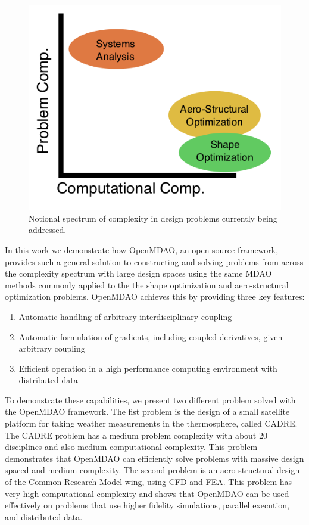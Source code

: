 \documentclass[]{aiaa-tc} %
\begin{document}
    \begin{figure}[!hbt]\begin{center}
      \includegraphics[width=.5\textwidth]{images/complexity_cartoon}
      \caption{ Notional spectrum of complexity in design problems currently being addressed. \label{fig:complexity_cartoon}}
    \end{center}\end{figure}

    In this work we demonstrate how OpenMDAO, an open-source framework, provides such a general
    solution to constructing and solving problems from across the complexity spectrum with large design spaces 
    using the same MDAO methods commonly applied to the the shape optimization and aero-structural optimization
    problems. OpenMDAO achieves this by providing three key features:

    \begin{enumerate}
      \item Automatic handling of arbitrary interdisciplinary coupling
      \item Automatic formulation of gradients, including coupled derivatives, given arbitrary coupling
      \item Efficient operation in a high performance computing environment with distributed data
    \end{enumerate}

    To demonstrate these capabilities, we present two different problem solved with 
    the OpenMDAO framework. The fist problem is the design of a small satellite 
    platform for taking weather measurements in the thermosphere, called CADRE. The CADRE problem has a
    medium problem complexity with about 20 disciplines and also medium computational complexity. 
    This problem demonstrates that OpenMDAO can efficiently solve problems with massive design spaced and 
    medium complexity. The second problem is an aero-structural design of 
    the Common Research Model wing, using CFD and FEA. This problem has very high computational 
    complexity and shows that OpenMDAO can be used effectively on problems that use higher fidelity 
    simulations, parallel execution, and distributed data. 
\end{document}
